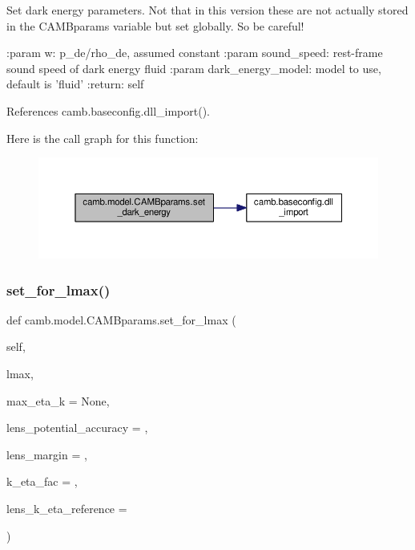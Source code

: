 \begin{DoxyVerb}Set dark energy parameters. Not that in this version these are not actually stored in
the CAMBparams variable but set globally. So be careful!

:param w: p_de/rho_de, assumed constant
:param sound_speed: rest-frame sound speed of dark energy fluid
:param dark_energy_model: model to use, default is 'fluid'
:return: self
\end{DoxyVerb}
 

References camb.\+baseconfig.\+dll\+\_\+import().

Here is the call graph for this function\+:
\nopagebreak
\begin{figure}[H]
\begin{center}
\leavevmode
\includegraphics[width=350pt]{classcamb_1_1model_1_1CAMBparams_a59530c15dc52ae15a94c678dbac52e24_cgraph}
\end{center}
\end{figure}
\mbox{\label{classcamb_1_1model_1_1CAMBparams_a2593dda108c56b3457585037e403236b}} 
\subsubsection{\texorpdfstring{set\+\_\+for\+\_\+lmax()}{set\_for\_lmax()}}
{\footnotesize\ttfamily def camb.\+model.\+C\+A\+M\+Bparams.\+set\+\_\+for\+\_\+lmax (\begin{DoxyParamCaption}\item[{}]{self,  }\item[{}]{lmax,  }\item[{}]{max\+\_\+eta\+\_\+k = {\ttfamily None},  }\item[{}]{lens\+\_\+potential\+\_\+accuracy = {},  }\item[{}]{lens\+\_\+margin = {},  }\item[{}]{k\+\_\+eta\+\_\+fac = {},  }\item[{}]{lens\+\_\+k\+\_\+eta\+\_\+reference = {} }\end{DoxyParamCaption})}


